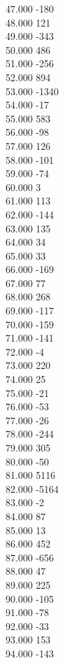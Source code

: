 { 47.000	-180 \\
 48.000	121 \\
 49.000	-343 \\
 50.000	486 \\
 51.000	-256 \\
 52.000	894 \\
 53.000	-1340 \\
 54.000	-17 \\
 55.000	583 \\
 56.000	-98 \\
 57.000	126 \\
 58.000	-101 \\
 59.000	-74 \\
 60.000	3 \\
 61.000	113 \\
 62.000	-144 \\
 63.000	135 \\
 64.000	34 \\
 65.000	33 \\
 66.000	-169 \\
 67.000	77 \\
 68.000	268 \\
 69.000	-117 \\
 70.000	-159 \\
 71.000	-141 \\
 72.000	-4 \\
 73.000	220 \\
 74.000	25 \\
 75.000	-21 \\
 76.000	-53 \\
 77.000	-26 \\
 78.000	-244 \\
 79.000	305 \\
 80.000	-50 \\
 81.000	5116 \\
 82.000	-5164 \\
 83.000	-2 \\
 84.000	87 \\
 85.000	13 \\
 86.000	452 \\
 87.000	-656 \\
 88.000	47 \\
 89.000	225 \\
 90.000	-105 \\
 91.000	-78 \\
 92.000	-33 \\
 93.000	153 \\
 94.000	-143 \\
}
